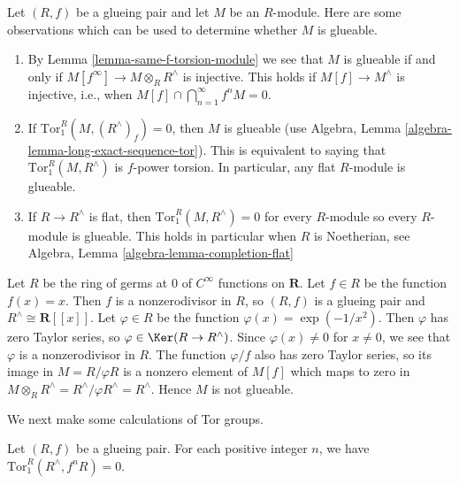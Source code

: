 \begin{remark}
\label{remark-glueable}
Let $(R, f)$ be a glueing pair and let $M$ be an $R$-module. Here are some 
observations which can be used to determine whether $M$ is glueable.
\begin{enumerate}
\item By Lemma \ref{lemma-same-f-torsion-module} we see that $M$ is glueable
if and only if $M[f^\infty] \to M \otimes_R R^\wedge$ is injective.
This holds if $M[f] \to M^\wedge$ is injective,
i.e., when $M[f] \cap \bigcap_{n = 1}^\infty f^n M = 0$.
\item If $\text{Tor}_1^R(M, (R^\wedge)_f) = 0$, then $M$ is glueable
(use Algebra, Lemma \ref{algebra-lemma-long-exact-sequence-tor}).
This is equivalent to saying that $\text{Tor}_1^R(M, R^\wedge)$ is
$f$-power torsion. In particular, any flat $R$-module is glueable.
\item If $R \to R^\wedge$ is flat, then $\text{Tor}_1^R(M, R^\wedge) = 0$
for every $R$-module so every $R$-module is glueable. This holds
in particular when $R$ is Noetherian, see
Algebra, Lemma \ref{algebra-lemma-completion-flat}
\end{enumerate}
\end{remark}

\begin{example}
\label{example-not-glueable-module}
\begin{reference}
\cite[\S 4, Remarques]{Beauville-Laszlo}
\end{reference}
Let $R$ be the ring of germs at $0$ of $C^\infty$ functions on $\mathbf{R}$.
Let $f \in R$ be the function $f(x) = x$. Then $f$ is a nonzerodivisor
in $R$, so $(R,f)$ is a glueing pair and $R^\wedge \cong \mathbf{R}[[x]]$. 
Let $\varphi \in R$ be the function $\varphi(x) = \exp(-1/x^2)$.
Then $\varphi$ has zero Taylor series, so $\varphi \in \Ker(R \to R^\wedge)$.
Since $\varphi(x) \neq 0$ for $x \neq 0$, we see that $\varphi$ is a
nonzerodivisor in $R$. The function $\varphi/f$ also has zero Taylor series,
so its image in $M = R/\varphi R$ is a nonzero element of $M[f]$
which maps to zero in
$M \otimes_R R^\wedge = R^\wedge/\varphi R^\wedge = R^\wedge$.
Hence $M$ is not glueable.
\end{example}

\noindent
We next make some calculations of Tor groups.

\begin{lemma}
\label{lemma-first-tor}
Let $(R, f)$ be a glueing pair. For each positive integer $n$, we have
$\text{Tor}^R_1(R^\wedge, f^n R) = 0$.
\end{lemma}

